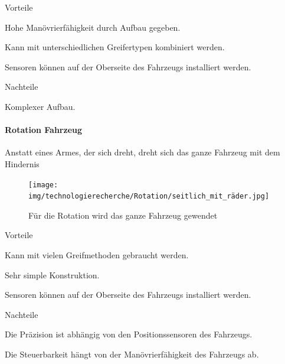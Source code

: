 \documentclass[../main.tex]{subfiles}
\begin{document}
\begin{minipage}[t]{0.48\textwidth}
    \begin{items}
          \item [Vorteile]
          \item Hohe Manövrierfähigkeit durch Aufbau gegeben.
          \item Kann mit unterschiedlichen Greifertypen kombiniert werden.
          \item Sensoren können auf der Oberseite des Fahrzeugs installiert werden.
    \end{items}
\end{minipage}
\hfill
\begin{minipage}[t]{0.48\textwidth}
    \begin{items}
          \item [Nachteile]
          \item Komplexer Aufbau.
    \end{items}
\end{minipage}
\newpage
\paragraph{Rotation Fahrzeug}
Anstatt eines Armes, der sich dreht, dreht sich das ganze Fahrzeug mit dem Hindernis

\begin{figure}[h!]
        \centering
        \texttt{[image: img/technologierecherche/Rotation/seitlich\_mit\_räder.jpg]}
        \caption{Für die Rotation wird das ganze Fahrzeug gewendet}
        \label{img:tech_seitlich_mit_räder}
\end{figure}

\begin{minipage}[t]{0.48\textwidth}
    \begin{items}
          \item [Vorteile]
          \item Kann mit vielen Greifmethoden gebraucht werden.
          \item Sehr simple Konstruktion.
          \item Sensoren können auf der Oberseite des Fahrzeugs installiert werden.
    \end{items}
\end{minipage}
\hfill
\begin{minipage}[t]{0.48\textwidth}
    \begin{items}
          \item [Nachteile]
          \item Die Präzision ist abhängig von den Positionssensoren des Fahrzeugs.
          \item Die Steuerbarkeit hängt von der Manövrierfähigkeit des Fahrzeugs ab.
    \end{items}
\end{minipage}
\newpage
\end{document}
